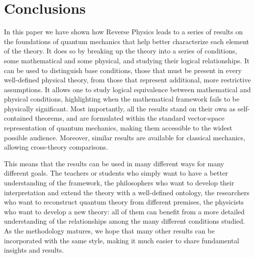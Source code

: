 \documentclass[entropy,article,submit,moreauthors]{Definitions/mdpi}
\begin{document}
\section{Conclusions}

In this paper we have shown how Reverse Physics leads to a series of results on the foundations of quantum mechanics that help better characterize each element of the theory. It does so by breaking up the theory into a series of conditions, some mathematical and some physical, and studying their logical relationships. It can be used to distinguish base conditions, those that must be present in every well-defined physical theory, from those that represent additional, more restrictive assumptions. It allows one to study logical equivalence between mathematical and physical conditions, highlighting when the mathematical framework fails to be physically significant. Most importantly, all the results stand on their own as self-contained theorems, and are formulated within the standard vector-space representation of quantum mechanics, making them accessible to the widest possible audience. Moreover, similar results are available for classical mechanics, allowing cross-theory comparisons.

This means that the results can be used in many different ways for many different goals. The teachers or students who simply want to have a better understanding of the framework, the philosophers who want to develop their interpretation and extend the theory with a well-defined ontology, the researchers who want to reconstruct quantum theory from different premises, the physicists who want to develop a new theory: all of them can benefit from a more detailed understanding of the relationships among the many different conditions studied. As the methodology matures, we hope that many other results can be incorporated with the same style, making it much easier to share fundamental insights and results.


\end{document}
